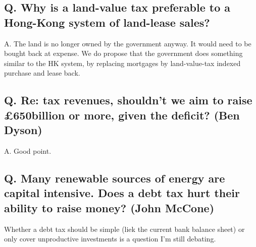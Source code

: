 \documentclass[]{tufte-handout}
\begin{document}
\hypertarget{q.-why-is-a-land-value-tax-preferable-to-a-hong-kong-system-of-land-lease-sales}{%
\subsection{Q. Why is a land-value tax preferable to a Hong-Kong system
of land-lease
sales?}\label{q.-why-is-a-land-value-tax-preferable-to-a-hong-kong-system-of-land-lease-sales}}

A. The land is no longer owned by the government anyway. It would need
to be bought back at expense. We do propose that the government does
something similar to the HK system, by replacing mortgages by
land-value-tax indexed purchase and lease back.

\hypertarget{q.-re-tax-revenues-shouldnt-we-aim-to-raise-650billion-or-more-given-the-deficit-ben-dyson}{%
\subsection{Q. Re: tax revenues, shouldn't we aim to raise £650billion
or more, given the deficit? (Ben
Dyson)}\label{q.-re-tax-revenues-shouldnt-we-aim-to-raise-650billion-or-more-given-the-deficit-ben-dyson}}

A. Good point.

\hypertarget{q.-many-renewable-sources-of-energy-are-capital-intensive.-does-a-debt-tax-hurt-their-ability-to-raise-money-john-mccone}{%
\subsection{Q. Many renewable sources of energy are capital intensive.
Does a debt tax hurt their ability to raise money? (John
McCone)}\label{q.-many-renewable-sources-of-energy-are-capital-intensive.-does-a-debt-tax-hurt-their-ability-to-raise-money-john-mccone}}

Whether a debt tax should be simple (liek the current bank balance
sheet) or only cover unproductive investments is a question I'm still
debating.
\end{document}
